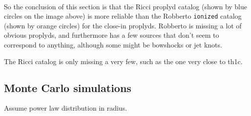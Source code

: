 \documentclass{article}
\begin{document}
    \begin{center}
    \end{center}
    { \hspace*{\fill} \\}
    

    So the conclusion of this section is that the Ricci proplyd catalog
(shown by blue circles on the image above) is more reliable than the
Robberto \texttt{ionized} catalog (shown by orange circles) for the
close-in proplyds. Robberto is missing a lot of obvious proplyds, and
furthermore has a few sources that don't seem to correspond to anything,
although some might be bowshocks or jet knots.

The Ricci catalog is only missing a very few, such as the one very close
to th1c.

    \subsection{Monte Carlo simulations}\label{monte-carlo-simulations}

Assume power law distribution in radius.
\end{document}
